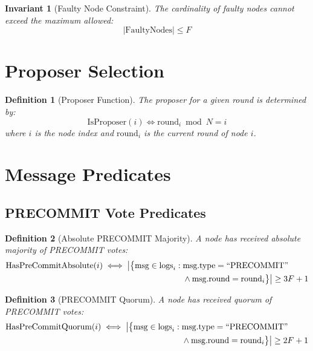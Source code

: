 \documentclass[11pt,a4paper,twoside]{article}
\newtheorem{definition}{Definition}[section]
\newtheorem{invariant}{Invariant}[section]
\begin{document}
\begin{invariant}[Faulty Node Constraint]
The cardinality of faulty nodes cannot exceed the maximum allowed:
\begin{equation}
|\text{FaultyNodes}| \leq F
\end{equation}
\end{invariant}

\section{Proposer Selection}

\begin{definition}[Proposer Function]
The proposer for a given round is determined by:
\begin{equation}
\text{IsProposer}(i) \iff \text{round}_i \bmod N = i
\end{equation}
where $i$ is the node index and $\text{round}_i$ is the current round of node $i$.
\end{definition}

\section{Message Predicates}

\subsection{PRECOMMIT Vote Predicates}

\begin{definition}[Absolute PRECOMMIT Majority]
A node has received absolute majority of PRECOMMIT votes:
\begin{align}
\text{HasPreCommitAbsolute}(i) \iff \big|\big\{\text{msg} \in \text{logs}_i : {} & \text{msg.type} = \text{``PRECOMMIT''} \notag \\
& \land \text{msg.round} = \text{round}_i\big\}\big| \geq 3F + 1
\end{align}
\end{definition}

\begin{definition}[PRECOMMIT Quorum]
A node has received quorum of PRECOMMIT votes:
\begin{align}
\text{HasPreCommitQuorum}(i) \iff \big|\big\{\text{msg} \in \text{logs}_i : {} & \text{msg.type} = \text{``PRECOMMIT''} \notag \\
& \land \text{msg.round} = \text{round}_i\big\}\big| \geq 2F + 1
\end{align}
\end{definition}
\end{document}
